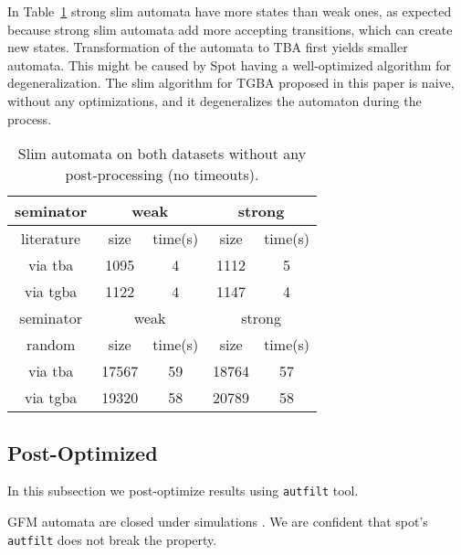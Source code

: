 \documentclass[
	digital,
nolof, nolot
]{fithesis3}
\begin{document}
	In Table~\ref{table:seminator:unoptimized} strong slim automata have more states than weak ones, as expected because strong slim automata add more accepting transitions, which can create new states. Transformation of the automata to TBA first yields smaller automata. This might be caused by Spot having a well-optimized algorithm for degeneralization. The slim algorithm for TGBA proposed in this paper is naive, without any optimizations, and it degeneralizes the automaton during the process.
\begin{table}[ht]
	\label{table:seminator:unoptimized}
	\centering
	\caption{Slim automata on both datasets without any post-processing (no timeouts).}
		\begin{tabular}{ |c||c|c|c|c| } 
			\hline
			seminator&\multicolumn{2}{c|}{weak}&\multicolumn{2}{c|}{strong} \\
			\hline
			literature&size&time(s)&size&time(s)\\
			\hhline{|=====|}
			
			via tba	&	1095	&4	& 1112 	&5\\
			\hline
			via tgba&	1122	&4		&1147	&4\\ 
			\hline
			\hline
			\hline
			seminator&\multicolumn{2}{c|}{weak}&\multicolumn{2}{c|}{strong} \\
			\hhline{|=====|}
			random&size&time(s)&size&time(s)\\
			\hline
			via tba&17567&	59& 18764 &57\\
			\hline
			via tgba&19320&	58& 20789&58\\ 
			\hline
		\end{tabular}
\end{table}
	\clearpage
	\subsection{Post-Optimized}
	In this subsection we post-optimize results using \texttt{autfilt} tool.
	
	GFM automata are closed under simulations \cite[Section~3.1]{hlavni}. We are confident that spot's \texttt{autfilt} does not break the property.
	
\end{document}

